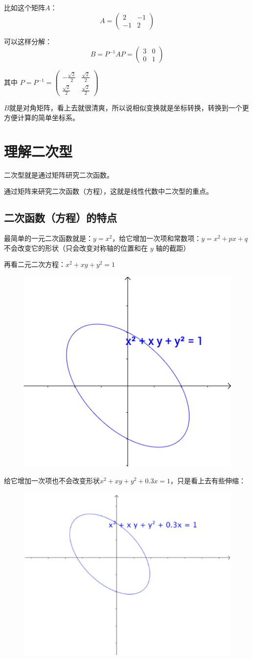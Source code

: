 \documentclass[12pt]{article}
\begin{document}
比如这个矩阵$A$：
$$
A = \begin{pmatrix}2&-1\\-1&2\end{pmatrix}
$$

可以这样分解：
$$
B = P^{-1}AP = \begin{pmatrix}3&0\\0&1\end{pmatrix}
$$

其中 $P = P^{-1} = \begin{pmatrix}
-\frac{\sqrt{2}}{2}&\frac{\sqrt{2}}{2}\\
\frac{\sqrt{2}}{2}&\frac{\sqrt{2}}{2}
\end{pmatrix}$

$B$就是对角矩阵，看上去就很清爽，所以说相似变换就是坐标转换，转换到一个更方便计算的简单坐标系。

\section{理解二次型\cite{How_To_Understand_Quadratic_Form}}
二次型就是通过矩阵研究二次函数。

通过矩阵来研究二次函数（方程），这就是线性代数中二次型的重点。

\subsection{二次函数（方程）的特点}
最简单的一元二次函数就是：$y = x^2$，给它增加一次项和常数项：$y = x^2 + px + q$ 不会改变它的形状（只会改变对称轴的位置和在 $y$ 轴的截距）

再看二元二次方程：$x^2 + xy + y^2 = 1$
\begin{figure}[H]
    \centering
    \includegraphics[width=.3\textwidth]{fig/UnderstandQuadraticForm_1.png}
\end{figure} 

给它增加一次项也不会改变形状$x^2 + xy + y^2 + 0.3x = 1$，只是看上去有些伸缩：
\begin{figure}[H]
    \centering
    \includegraphics[width=.3\textwidth]{fig/UnderstandQuadraticForm_2.png}
\end{figure} 
\end{document}
